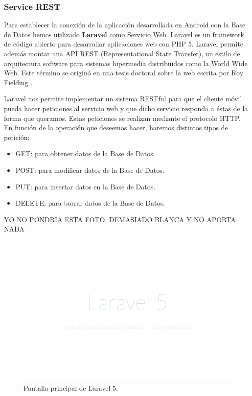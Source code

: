 \subsubsection{Service REST}\label{sssec:rest}

Para establecer la conexión de la aplicación desarrollada en Android con la Base de Datos hemos utilizado \textbf{Laravel} como Servicio Web. Laravel \cite{ref:laravel} es un framework de código abierto para desarrollar aplicaciones web con PHP 5. Laravel permite además montar una API REST (Representational State Transfer), un estilo de arquitectura software para sistemas hipermedia distribuidos como la World Wide Web. Este término se originó en una tesis doctoral sobre la web escrita por Roy Fielding \cite{ref:RESTPhd}.

Laravel nos permite implementar un sistema RESTful para que el cliente móvil pueda hacer peticiones al servicio web y que dicho servicio responda a éstas de la forma que queramos. Estas peticiones se realizan mediante el protocolo HTTP. En función de la operación que deseemos hacer, haremos distintos tipos de petición;

\begin{itemize}
	\item GET: para obtener datos de la Base de Datos.
	\item POST: para modificar datos de la Base de Datos.
	\item PUT: para insertar datos en la Base de Datos.
	\item DELETE: para borrar datos de la Base de Datos.
\end{itemize}

YO NO PONDRIA ESTA FOTO, DEMASIADO BLANCA Y NO APORTA NADA 

\begin{figure}[H]
\centering
\includegraphics[keepaspectratio, scale=0.30]{Media/Captures/laravel5.png}
\caption{Pantalla principal de Laravel 5.}
\label{fig:laravel5}
\end{figure}


